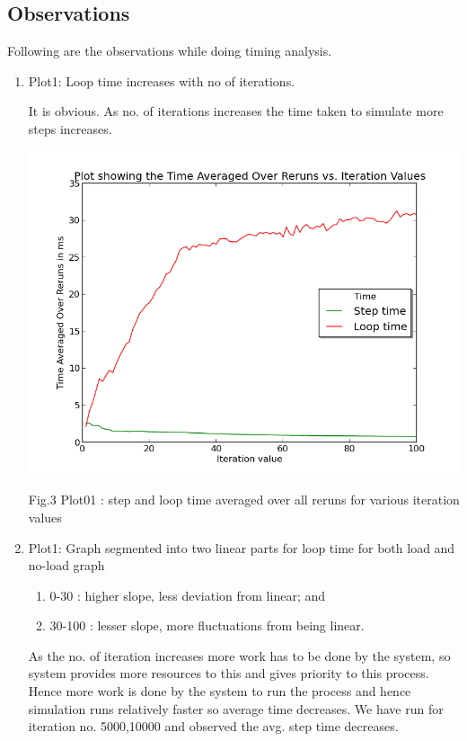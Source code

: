 \documentclass[a4paper,11pt]{article}
\begin{document}
\subsection{Observations}
Following are the observations while doing timing analysis.
\begin{enumerate}
\item{Plot1: Loop time increases with no of iterations.}
\begin{description}
It is obvious. As no. of iterations increases the time taken to simulate more steps increases.
\end{description}


\begin{center}
\includegraphics[scale=0.5]{./plots/g31_lab09_plot01.png}
\begin{center}
Fig.3 Plot01 : step and loop time averaged over all reruns for various iteration values
\end{center}
\end{center}

\item{Plot1: Graph segmented into two linear parts for loop time for both load and no-load graph
\begin{enumerate}
\item{0-30 :}
	higher slope, less deviation from linear; and
\item{30-100 :}
	lesser slope, more fluctuations from being linear.
\end{enumerate}}

\begin{description}
As the no. of iteration increases more work has to be done by the system, so system provides more resources to this and gives priority to this process. Hence more work is done by the system to run the process and hence simulation runs relatively faster so average time decreases.
We have run for iteration no. 5000,10000 and observed the avg. step time decreases.
\end{description}


\end{enumerate}
\end{document}
